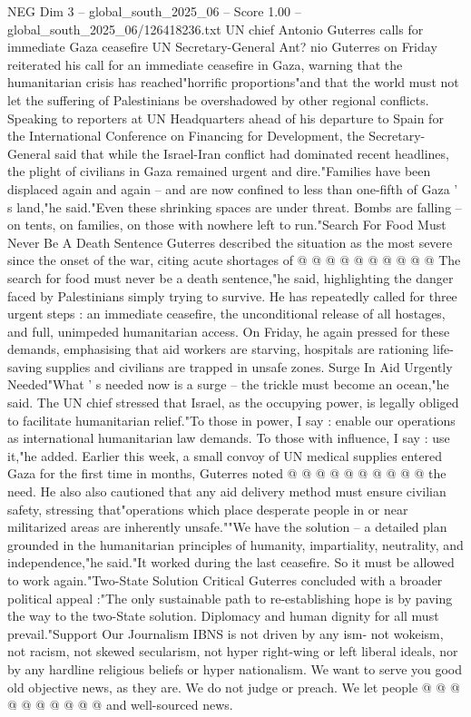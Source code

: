 \begin{textsample}{NEG Dim 3 – global\_south\_2025\_06 – Score 1.00 – global\_south\_2025\_06/126418236.txt}  \label{ex:f3_neg_258}
UN chief Antonio Guterres calls for immediate Gaza ceasefire UN Secretary-General Ant? nio Guterres on Friday reiterated his call for an immediate ceasefire in Gaza, warning that the humanitarian crisis has reached"horrific proportions"and that the world must not let the suffering of Palestinians be overshadowed by other regional conflicts.
Speaking to reporters at UN Headquarters ahead of his departure to Spain for the International Conference on Financing for Development, the Secretary-General said that while the Israel-Iran conflict had dominated recent headlines, the plight of civilians in Gaza remained urgent and dire."Families have been displaced again and again -- and are now confined to less than one-fifth of Gaza ' s land,"he said."Even these shrinking spaces are under threat.
Bombs are falling -- on tents, on families, on those with nowhere left to run."Search For Food Must Never Be A Death Sentence Guterres described the situation as the most severe since the onset of the war, citing acute shortages of @ @ @ @ @ @ @ @ @ @ The search for food must never be a death sentence,"he said, highlighting the danger faced by Palestinians simply trying to survive.
He has repeatedly called for three urgent steps : an immediate ceasefire, the unconditional release of all hostages, and full, unimpeded humanitarian access.
On Friday, he again pressed for these demands, emphasising that aid workers are starving, hospitals are rationing life-saving supplies and civilians are trapped in unsafe zones.
Surge In Aid Urgently Needed"What ' s needed now is a surge -- the trickle must become an ocean,"he said.
The UN chief stressed that Israel, as the occupying power, is legally obliged to facilitate humanitarian relief."To those in power, I say : enable our operations as international humanitarian law demands.
To those with influence, I say : use it,"he added.
Earlier this week, a small convoy of UN medical supplies entered Gaza for the first time in months, Guterres noted @ @ @ @ @ @ @ @ @ @ the need.
He also also cautioned that any aid delivery method must ensure civilian safety, stressing that"operations which place desperate people in or near militarized areas are inherently unsafe.""We have the solution -- a detailed plan grounded in the humanitarian principles of humanity, impartiality, neutrality, and independence,"he said."It worked during the last ceasefire.
So it must be allowed to work again."Two-State Solution Critical Guterres concluded with a broader political appeal :"The only sustainable path to re-establishing hope is by paving the way to the two-State solution.
Diplomacy and human dignity for all must prevail."Support Our Journalism IBNS is not driven by any ism- not wokeism, not racism, not skewed secularism, not hyper right-wing or left liberal ideals, nor by any hardline religious beliefs or hyper nationalism.
We want to serve you good old objective news, as they are.
We do not judge or preach.
We let people @ @ @ @ @ @ @ @ @ @ and well-sourced news.

\end{textsample}

